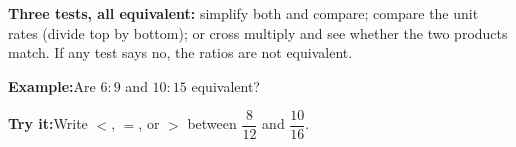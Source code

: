 \documentclass[12pt]{article}
\begin{document}
\begin{formulabox}\textbf{Three tests, all equivalent:} simplify both and compare;
compare the unit rates (divide top by bottom); or cross multiply and see whether the two
products match. If any test says no, the ratios are not equivalent.
\end{formulabox}
\begin{examplebox}\textbf{Example:}\quad Are $6 : 9$ and $10 : 15$ equivalent?
\end{examplebox}
\begin{tryitbox}\textbf{Try it:}\quad Write $<$, $=$, or $>$ between $\dfrac{8}{12}$ and
$\dfrac{10}{16}$.\\[2pt]
\end{tryitbox}
\end{document}
